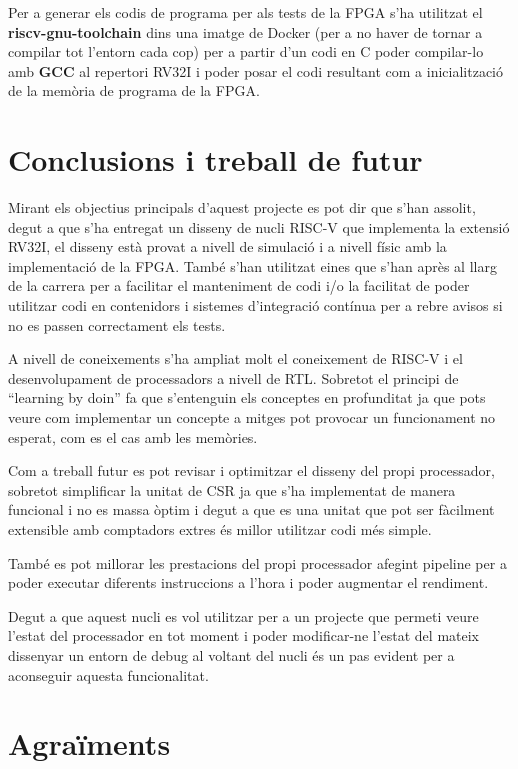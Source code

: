 \documentclass[10pt,a4paper,twocolumn,twoside]{article}
\begin{document}
Per a generar els codis de programa per als tests de la FPGA s'ha utilitzat el \textbf{riscv-gnu-toolchain} dins una imatge de Docker (per a no haver de tornar a compilar tot l'entorn cada cop) per a partir d'un codi en C poder compilar-lo amb \textbf{GCC} al repertori RV32I i poder posar el codi resultant com a inicialització de la memòria de programa de la FPGA.

\section{Conclusions i treball de futur}  %

Mirant els objectius principals d'aquest projecte es pot dir que s'han assolit, degut a que s'ha entregat un disseny de nucli RISC-V que implementa la extensió RV32I, el disseny està provat a nivell de simulació i a nivell físic amb la implementació de la FPGA. També s'han utilitzat eines que s'han après al llarg de la carrera per a facilitar el manteniment de codi i/o la facilitat de poder utilitzar codi en contenidors i sistemes d'integració contínua per a rebre avisos si no es passen correctament els tests.

A nivell de coneixements s'ha ampliat molt el coneixement de RISC-V i el desenvolupament de processadors a nivell de RTL. Sobretot el principi de ``learning by doin'' fa que s'entenguin els conceptes en profunditat ja que pots veure com implementar un concepte a mitges pot provocar un funcionament no esperat, com es el cas amb les memòries.

Com a treball futur es pot revisar i optimitzar el disseny del propi processador, sobretot simplificar la unitat de CSR ja que s'ha implementat de manera funcional i no es massa òptim i degut a que es una unitat que pot ser fàcilment extensible amb comptadors extres és millor utilitzar codi més simple.

També es pot millorar les prestacions del propi processador afegint pipeline per a poder executar diferents instruccions a l'hora i poder augmentar el rendiment.

Degut a que aquest nucli es vol utilitzar per a un projecte que permeti veure l'estat del processador en tot moment i poder modificar-ne l'estat del mateix dissenyar un entorn de debug al voltant del nucli és un pas evident per a aconseguir aquesta funcionalitat.
    
    



\section*{Agraïments}
\end{document}
